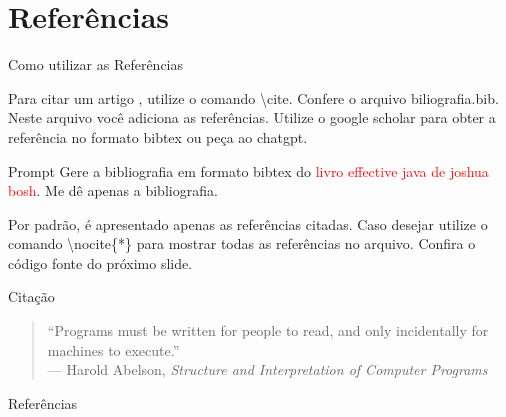 \documentclass{beamer}
\begin{document}
\section{Referências}
\begin{frame}[fragile]{Como utilizar as Referências}

Para citar um artigo \cite{bloch2017effective}, utilize o comando \textbackslash cite. Confere o arquivo biliografia.bib. Neste arquivo você adiciona as referências. Utilize o google scholar para obter a referência no formato bibtex ou peça ao chatgpt.

\begin{block}{Prompt}
Gere a bibliografia em formato bibtex do \textcolor{red}{ livro effective java de joshua bosh}. Me dê apenas a bibliografia.	
\end{block}

Por padrão, é apresentado apenas as referências citadas. Caso desejar utilize o comando \textbackslash nocite\{*\} para mostrar todas as referências no arquivo. Confira o código fonte do próximo slide.


\end{frame}

\begin{frame}{Citação}

\begin{quote}
``Programs must be written for people to read, and only incidentally for machines to execute.'' \\
\hfill --- Harold Abelson, \textit{Structure and Interpretation of Computer Programs}
\end{quote}

\end{frame}


\begin{frame}[fragile]{Referências}

        
        
        \nocite{*}

\end{frame}

\end{document}
